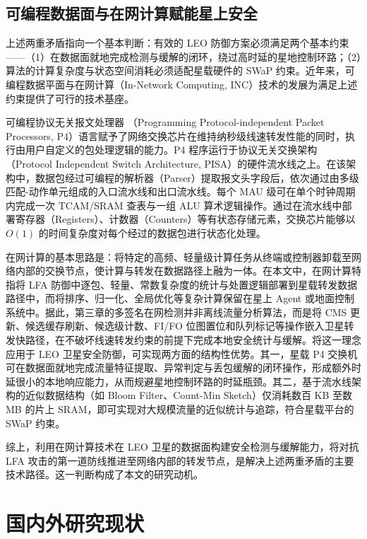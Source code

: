 \subsection{可编程数据面与在网计算赋能星上安全}

上述两重矛盾指向一个基本判断：有效的 LEO 防御方案必须满足两个基本约束——（1）在数据面就地完成检测与缓解的闭环，绕过高时延的星地控制环路；（2）算法的计算复杂度与状态空间消耗必须适配星载硬件的 SWaP 约束。近年来，可编程数据平面与在网计算（In-Network Computing, INC）技术的发展为满足上述约束提供了可行的技术基座。

可编程协议无关报文处理器 （Programming Protocol-independent Packet Processors, P4）语言赋予了网络交换芯片在维持纳秒级线速转发性能的同时，执行由用户自定义的包处理逻辑的能力。P4 程序运行于协议无关交换架构（Protocol Independent Switch Architecture, PISA）的硬件流水线之上。在该架构中，数据包经过可编程的解析器（Parser）提取报文头字段后，依次通过由多级匹配-动作单元组成的入口流水线和出口流水线。每个 MAU 级可在单个时钟周期内完成一次 TCAM/SRAM 查表与一组 ALU 算术逻辑操作。通过在流水线中部署寄存器（Registers）、计数器（Counters）等有状态存储元素，交换芯片能够以 $O(1)$ 的时间复杂度对每个经过的数据包进行状态化处理。

在网计算的基本思路是：将特定的高频、轻量级计算任务从终端或控制器卸载至网络内部的交换节点，使计算与转发在数据路径上融为一体。在本文中，在网计算特指将 LFA 防御中逐包、轻量、常数复杂度的统计与处置逻辑部署到星载转发数据路径中，而将排序、归一化、全局优化等复杂计算保留在星上 Agent 或地面控制系统中。据此，第三章的多签名在网检测并非离线流量分析算法，而是将 CMS 更新、候选缓存刷新、候选级计数、FI/FO 位图置位和队列标记等操作嵌入卫星转发快路径，在不破坏线速转发约束的前提下完成本地安全统计与缓解。将这一理念应用于 LEO 卫星安全防御，可实现两方面的结构性优势。其一，星载 P4 交换机可在数据面就地完成流量特征提取、异常判定与丢包缓解的闭环操作，形成额外时延很小的本地响应能力，从而规避星地控制环路的时延瓶颈。其二，基于流水线架构的近似数据结构（如 Bloom Filter、Count-Min Sketch）仅消耗数百 KB 至数 MB 的片上 SRAM，即可实现对大规模流量的近似统计与追踪，符合星载平台的 SWaP 约束。

综上，利用在网计算技术在 LEO 卫星的数据面构建安全检测与缓解能力，将对抗 LFA 攻击的第一道防线推进至网络内部的转发节点，是解决上述两重矛盾的主要技术路径。这一判断构成了本文的研究动机。

\section{国内外研究现状}


